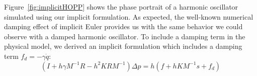 Figure~\ref{fig:implicitHOPP} shows the phase portrait of a harmonic oscillator simulated using our implicit formulation.
As expected, the well-known numerical damping effect of implicit Euler provides us with the same behavior we could observe with a damped harmonic oscillator.
To include a damping term in the physical model, we derived an implicit formulation which includes a damping term $f_{d} = -\gamma \dot{q}$:
\begin{equation}
	\label{eq:arpsLinearSystemDamped}
	( I + h\gamma M^{-1}R -h^{2}KRM^{-1} ) \Delta p = h( f + h KM^{-1}s + f_{d})
\end{equation}
